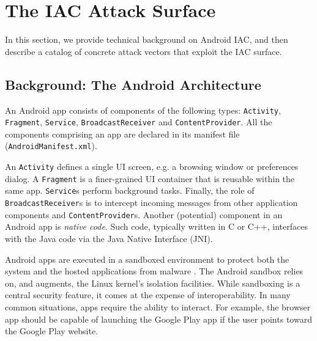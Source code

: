 \section{The IAC Attack Surface}\label{Se:surface}

In this section, we provide technical background on Android IAC, and then describe a catalog of concrete attack vectors that exploit the IAC surface.

\subsection{Background: The Android Architecture}\label{Se:andarchitecture}

An Android app consists of components of the following types:
{\tt Activity}, {\tt Fragment}, {\tt Service},
{\tt BroadcastReceiver} and {\tt ContentProvider}. 
%
All the components comprising an app 
are declared in its manifest
file (\texttt{AndroidManifest.xml}).

An {\tt Activity}
defines a single UI screen, e.g. a browsing window or preferences dialog. A {\tt Fragment} is
a finer-grained UI container that is reusable within the same app. {\tt Service}s perform background tasks. Finally, the role of {\tt BroadcastReceiver}s is to intercept incoming messages from other application components and {\tt ContentProvider}s.
%
Another (potential) component in an Android app is \textit{native code}. Such code,
typically written in C or C++, interfaces with the Java code via the Java Native Interface (JNI).

Android apps are executed in a sandboxed environment
to protect both the system and the hosted applications from
malware \cite{EOM:SP09}. 
%
%
The Android sandbox relies on, and augments, the Linux kernel's isolation
facilities.
%
%
While sandboxing is a central security feature, it comes at the expense of interoperability. In many common situations, apps require the ability to interact. For example, the browser app should be capable of launching the Google Play app if the user points toward the Google Play website. 

